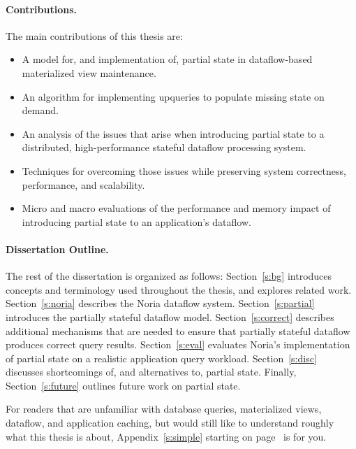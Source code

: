 


\paragraph{Contributions.}

The main contributions of this thesis are:

\begin{itemize}
 \item A model for, and implementation of, partial state in dataflow-based
   materialized view maintenance.
 \item An algorithm for implementing upqueries to populate missing state on
   demand.
 \item An analysis of the issues that arise when introducing partial state to a
   distributed, high-performance stateful dataflow processing system.
 \item Techniques for overcoming those issues while preserving system
	 correctness, performance, and scalability.
 \item Micro and macro evaluations of the performance and memory impact of
	 introducing partial state to an application's dataflow.
\end{itemize}

\paragraph{Dissertation Outline.}

The rest of the dissertation is organized as follows: Section~\ref{s:bg}
introduces concepts and terminology used throughout the thesis, and explores
related work. Section~\ref{s:noria} describes the Noria dataflow system.
Section~\ref{s:partial} introduces the partially stateful dataflow model.
Section~\ref{s:correct} describes additional mechanisms that are needed to
ensure that partially stateful dataflow produces correct query results.
Section~\ref{s:eval} evaluates Noria's implementation of partial state on a
realistic application query workload. Section~\ref{s:disc} discusses
shortcomings of, and alternatives to, partial state. Finally,
Section~\ref{s:future} outlines future work on partial state.

For readers that are unfamiliar with database queries, materialized views,
dataflow, and application caching, but would still like to understand roughly
what this thesis is about, Appendix~\ref{s:simple} starting on
page~\pageref{s:simple} is for you.

